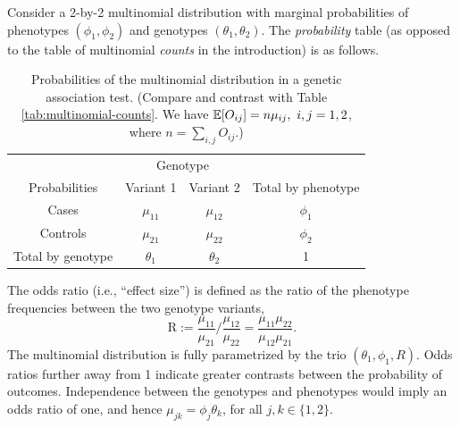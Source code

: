 Consider a 2-by-2 multinomial distribution with marginal probabilities of phenotypes $(\phi_1, \phi_2)$ and genotypes $(\theta_1, \theta_2)$.
The \emph{probability} table (as opposed to the table of multinomial \emph{counts} in the introduction) is as follows.
\begin{table}[h]\label{tab:multinomial-probabilites}
\begin{center}
    \begin{tabular}{cccc}
    \hline
    & \multicolumn{2}{c}{Genotype} \\
    \cline{2-3}
    Probabilities & Variant 1 & Variant 2 & Total by phenotype \\
    \hline
    Cases & $\mu_{11}$ & $\mu_{12}$ & $\phi_1$ \\
    Controls & $\mu_{21}$ & $\mu_{22}$ & $\phi_2$ \\
    Total by genotype & $\theta_1$ & $\theta_2$ & 1 \\
    \hline
    \end{tabular}
    \caption{Probabilities of the multinomial distribution in a genetic association test. (Compare and contrast with 
    Table \ref{tab:multinomial-counts}. We have $\E[ O_{ij}] = n\mu_{ij},\ i,j=1,2$, where $n = \sum_{i,j} O_{ij}$.) }
\end{center}
\end{table}

The odds ratio (i.e., ``effect size'') is defined as the ratio of the phenotype frequencies between the two genotype variants,
\begin{equation} \label{eq:odds-ratio}
    \text{R} := \frac{\mu_{11}}{\mu_{21}}\Big/\frac{\mu_{12}}{\mu_{22}}
    = \frac{\mu_{11}\mu_{22}}{\mu_{12}\mu_{21}}.
\end{equation}
The multinomial distribution is fully parametrized by the trio $(\theta_1, \phi_1, R)$.
Odds ratios further away from 1 indicate greater contrasts between the probability of outcomes.
Independence between the genotypes and phenotypes would imply an odds ratio of one, and hence $\mu_{jk} = \phi_j\theta_k$, for all $j,k \in\{1,2\}$.

